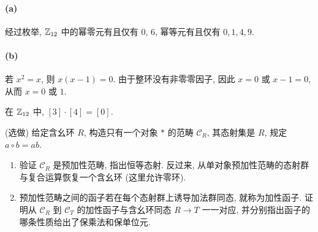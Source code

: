 \documentclass{article}
\begin{document}
\begin{solution}
	\paragraph{(a)} 经过枚举, $\mathbb{Z}_{12}$ 中的幂零元有且仅有 $0$, $6$, 幂等元有且仅有 $0, 1, 4, 9$. 

	\paragraph{(b)} 若 $x^2 = x$, 则 $x(x-1) = 0$. 由于整环没有非零零因子, 因此 $x = 0$ 或 $x-1 = 0$, 从而 $x=0$ 或 $1$.

	在 $\mathbb{Z}_{12}$ 中, $[3] \cdot [4] = [0]$.
\end{solution}

\begin{problem}
({\heiti 选做}) 给定含幺环 $R$, 构造只有一个对象 $\ast$ 的范畴 $\mathcal C_R$, 其态射集是 $R$, 规定 $a\circ b=ab$.
\begin{enumerate}
  \item[(a)] 验证 $\mathcal C_R$ 是预加性范畴, 指出恒等态射. 反过来, 从单对象预加性范畴的态射群与复合运算恢复一个含幺环 (这里允许零环).
  \item[(b)] 预加性范畴之间的函子若在每个态射群上诱导加法群同态, 就称为加性函子. 证明从 $\mathcal C_R$ 到 $\mathcal C_T$ 的加性函子与含幺环同态 $R\to T$ 一一对应, 并分别指出函子的哪条性质给出了保乘法和保单位元.
\end{enumerate}
\end{problem}
\end{document}
